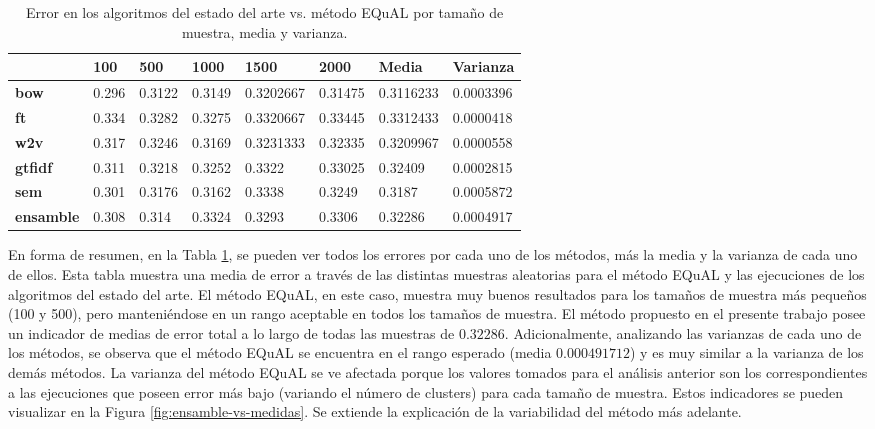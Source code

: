 \begin{table}[h!]
	\footnotesize
	\caption{Error en los algoritmos del estado del arte vs. método EQuAL por tamaño de muestra, media y varianza.}
	\begin{tabularx}{\textwidth}{XXXXXXXX}
		\toprule
		& \textbf{100} & \textbf{500} & \textbf{1000} & \textbf{1500} & \textbf{2000} & \textbf{Media} & \textbf{Varianza} \\
		\midrule
		\textbf{bow}      & 0.296 & 0.3122 & 0.3149 & 0.3202667 & 0.31475 & \cellcolor[HTML]{D9EAD3}0.3116233 & 0.0003396                          \\
		\textbf{ft}       & 0.334 & 0.3282 & 0.3275 & 0.3320667 & 0.33445 & 0.3312433                         & \cellcolor[HTML]{D9EAD3}0.0000418 \\
		\textbf{w2v}      & 0.317 & 0.3246 & 0.3169 & 0.3231333 & 0.32335 & 0.3209967                         & 0.0000558                         \\
		\textbf{gtfidf}   & 0.311 & 0.3218 & 0.3252 & 0.3322       & 0.33025 & 0.32409                              & 0.0002815                              \\
		\textbf{sem}      & 0.301 & 0.3176 & 0.3162 & 0.3338       & 0.3249  & 0.3187                               & 0.0005872                                \\
		\textbf{ensamble} & 0.308 & 0.314  & 0.3324 & 0.3293       & 0.3306  & 0.32286                              & 0.0004917                              \\
		\bottomrule
	\end{tabularx}
	\label{tab:error-arte-equal}
\end{table}

\bigskip En forma de resumen, en la Tabla \ref{tab:error-arte-equal}, se pueden ver todos los errores por cada uno de los métodos, más la media y la varianza de cada uno de ellos. Esta tabla muestra una media de error a través de las distintas muestras aleatorias para el método EQuAL y las ejecuciones de los algoritmos del estado del arte. El método EQuAL, en este caso, muestra muy buenos resultados para los tamaños de muestra más pequeños (100 y 500), pero manteniéndose en un rango aceptable en todos los tamaños de muestra. El método propuesto en el presente trabajo posee un indicador de medias de error total a lo largo de todas las muestras de \(0.32286\). Adicionalmente, analizando las varianzas de cada uno de los métodos, se observa que el método EQuAL se encuentra en el rango esperado (media \(0.000491712\)) y es muy similar a la varianza de los demás métodos. La varianza del método EQuAL se ve afectada porque los valores tomados para el análisis anterior son los correspondientes a las ejecuciones que poseen error más bajo (variando el número de clusters) para cada tamaño de muestra. Estos indicadores se pueden visualizar en la Figura \ref{fig:ensamble-vs-medidas}. Se extiende la explicación de la variabilidad del método más adelante.

